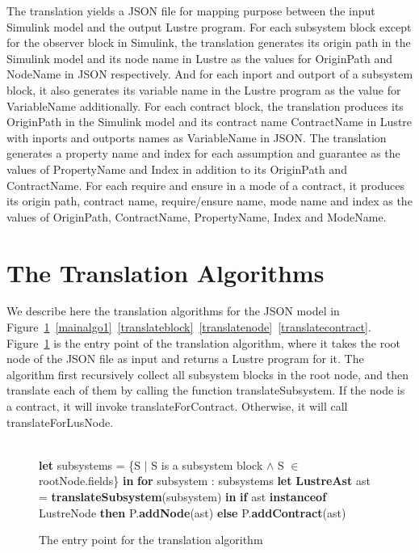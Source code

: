 \documentclass{article}
\begin{document}
The translation yields a JSON file for mapping purpose between the input Simulink model and the output Lustre program. 
For each subsystem block except for the observer block in Simulink, the translation generates its origin path in the Simulink model and its node name in Lustre as the values for \textsf{OriginPath} and \textsf{NodeName} in JSON respectively.
And for each inport and outport of a subsystem block, it also generates its variable name in the Lustre program as the value for \textsf{VariableName} additionally.
For each contract block, the translation produces its \textsf{OriginPath} in the Simulink model and its contract name \textsf{ContractName} in Lustre with inports and outports names as \textsf{VariableName} in JSON.
The translation generates a property name and index for each assumption and guarantee as the values of \textsf{PropertyName} and \textsf{Index} in addition to its \textsf{OriginPath} and \textsf{ContractName}.
For each require and ensure in a mode of a contract, it produces its origin path, contract name, require/ensure name, mode name and index as the values of 
\textsf{OriginPath}, \textsf{ContractName}, \textsf{PropertyName}, \textsf{Index} and \textsf{ModeName}.

\section{The Translation Algorithms}

We describe here the translation algorithms for the JSON model in Figure~\ref{mainalgo}~\ref{mainalgo1}~\ref{translateblock}~\ref{translatenode}~\ref{translatecontract}.
Figure~\ref{mainalgo} is the entry point of the translation algorithm, where it takes the root node of the JSON file as input and returns a Lustre program for it.
The algorithm first recursively collect all subsystem blocks in the root node, and then translate each of them by calling the function \textsf{translateSubsystem}. 
If the node is a contract, it will invoke \textsf{translateForContract}.
Otherwise, it will call \textsf{translateForLusNode}.


\begin{figure}
\begin{algorithmic}
\\
\State \textbf{let} subsystems = \{S $\mid$ S is a subsystem block $\land$ S $\in$ rootNode.fields\} \textbf{in}
\State \textbf{for} subsystem : subsystems
\State {\ \ \ \ } \textbf{let} \textbf{LustreAst} ast = \textbf{translateSubsystem}(subsystem) \textbf{in}
\State {\ \ \ \ } \textbf{if}  ast \textbf{instanceof} LustreNode \textbf{then}
\State {\ \ \ \ \ \ \ \ } P.\textbf{addNode}(ast)
\State {\ \ \ \ } \textbf{else}
\State {\ \ \ \ \ \ \ \ } P.\textbf{addContract}(ast)
\EndFunction
\end{algorithmic}
\label{mainalgo}
\caption{The entry point for the translation algorithm}
\end{figure}
\end{document}
